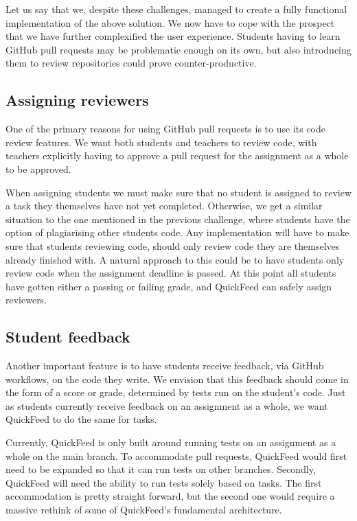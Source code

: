 Let us say that we, despite these challenges, managed to create a fully functional implementation of the above solution.
We now have to cope with the prospect that we have further complexified the user experience.
Students having to learn GitHub pull requests may be problematic enough on its own, but also introducing them to review repositories could prove counter-productive.

\subsection{Assigning reviewers}

One of the primary reasons for using GitHub pull requests is to use its code review features.
We want both students and teachers to review code, with teachers explicitly having to approve a pull request for the assignment as a whole to be approved.

When assigning students we must make sure that no student is assigned to review a task they themselves have not yet completed.
Otherwise, we get a similar situation to the one mentioned in the previous challenge, where students have the option of plagiarising other students code.
Any implementation will have to make sure that students reviewing code, should only review code they are themselves already finished with.
A natural approach to this could be to have students only review code when the assignment deadline is passed.
At this point all students have gotten either a passing or failing grade, and QuickFeed can safely assign reviewers.


\subsection{Student feedback}

Another important feature is to have students receive feedback, via GitHub workflows, on the code they write.
We envision that this feedback should come in the form of a score or grade, determined by tests run on the student's code.
Just as students currently receive feedback on an assignment as a whole, we want QuickFeed to do the same for tasks.

Currently, QuickFeed is only built around running tests on an assignment as a whole on the main branch.
To accommodate pull requests, QuickFeed would first need to be expanded so that it can run tests on other branches.
Secondly, QuickFeed will need the ability to run tests solely based on tasks.
The first accommodation is pretty straight forward, but the second one would require a massive rethink of some of QuickFeed's fundamental architecture.

